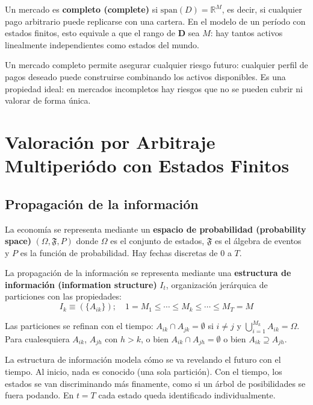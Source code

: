 \documentclass[12pt]{article}
\begin{document}
Un mercado es \textbf{completo (complete)} si $\text{span}(D) = \mathbb{R}^M$, es decir, si cualquier pago arbitrario puede replicarse con una cartera. En el modelo de un per\'iodo con estados finitos, esto equivale a que el rango de $\mathbf{D}$ sea $M$: hay tantos activos linealmente independientes como estados del mundo.

\begin{intuicion}
Un mercado completo permite asegurar cualquier riesgo futuro: cualquier perfil de pagos deseado puede construirse combinando los activos disponibles. Es una propiedad ideal: en mercados incompletos hay riesgos que no se pueden cubrir ni valorar de forma \'unica.
\end{intuicion}

\section{Valoraci\'on por Arbitraje Multiperi\'odo con Estados Finitos}

\subsection{Propagaci\'on de la informaci\'on}

La econom\'ia se representa mediante un \textbf{espacio de probabilidad (probability space)} $(\Omega, \mathfrak{F}, P)$ donde $\Omega$ es el conjunto de estados, $\mathfrak{F}$ es el \'algebra de eventos y $P$ es la funci\'on de probabilidad. Hay fechas discretas de $0$ a $T$.

La propagaci\'on de la informaci\'on se representa mediante una \textbf{estructura de informaci\'on (information structure)} $I_t$, organizaci\'on jer\'arquica de particiones con las propiedades:
\begin{equation}
    I_k \equiv (\{A_{ik}\}); \quad 1 = M_1 \leq \cdots \leq M_k \leq \cdots \leq M_T = M
\end{equation}

Las particiones se refinan con el tiempo: $A_{ik} \cap A_{jk} = \emptyset$ si $i \neq j$ y $\bigcup_{i=1}^{M_k} A_{ik} = \Omega$. Para cualesquiera $A_{ik}$, $A_{jh}$ con $h > k$, o bien $A_{ik} \cap A_{jh} = \emptyset$ o bien $A_{ik} \supseteq A_{jh}$.

\begin{intuicion}
La estructura de informaci\'on modela c\'omo se va revelando el futuro con el tiempo. Al inicio, nada es conocido (una sola partici\'on). Con el tiempo, los estados se van discriminando m\'as finamente, como si un \'arbol de posibilidades se fuera podando. En $t = T$ cada estado queda identificado individualmente.
\end{intuicion}
\end{document}
